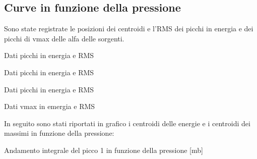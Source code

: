 \subsection{Curve in funzione della pressione}
\FloatBarrier
Sono state registrate le posizioni dei centroidi e l'RMS dei picchi in energia e dei picchi di vmax delle alfa delle sorgenti.

\begin{tabella}
 \centering
  
 \caption{Dati picchi in energia e RMS}
 \label{tab:tab_integral1.tex}
\end{tabella}

\begin{tabella}
 \centering
  
 \caption{Dati picchi in energia e RMS}
 \label{tab:tab_integral2.tex}
\end{tabella}

\begin{tabella}
 \centering
  
 \caption{Dati picchi in energia e RMS}
 \label{tab:tab_integral3.tex}
\end{tabella}

\begin{tabella}
 \centering
  
 \caption{Dati vmax in emergia e RMS}
 \label{tab:tab_vmax.tex}
\end{tabella}




In seguito sono stati riportati in grafico i centroidi delle energie e i centroidi dei massimi in funzione della pressione:

\begin{grafico}
 \centering
 \caption{Andamento integrale del picco 1 in funzione della pressione [mb]} 
 \label{gr:picchi_int1} 
\end{grafico}

